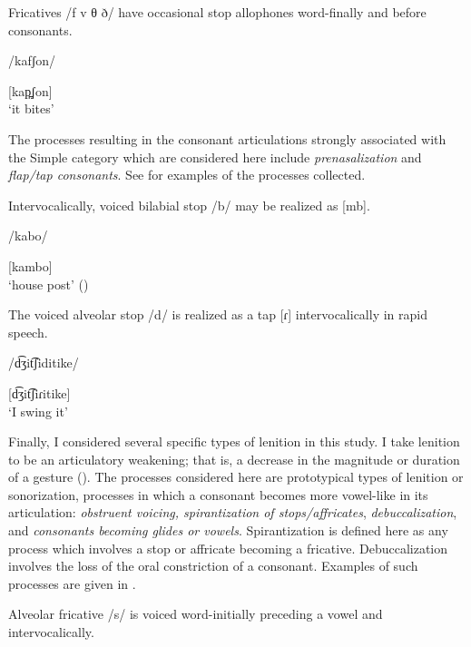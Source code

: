 \ea\label{ex:7.11}

Fricatives /f v θ ð/ have occasional stop allophones word-finally and before consonants.

/kafʃon/

[kap̪ʃon]\\
\glt ‘it bites’
\citep[16]{Newmark1957}
\z

\hspace*{-0.19368pt}The processes resulting in the consonant articulations strongly associated with the Simple category which are considered here include \textit{prenasalization} and \textit{flap/tap consonants}. See  for examples of the processes collected.

\ea\label{ex:7.12}

Intervocalically, voiced bilabial stop /b/ may be realized as [mb].

/kabo/

[kambo]\\
\glt ‘house post’
(\citealt[27]{KotapishKotapish1973})
\z

\ea\label{ex:7.13}

The voiced alveolar stop /d/ is realized as a tap [ɾ] intervocalically in rapid speech.

/d͡ʒit͡ʃiditike/

[d͡ʒit͡ʃiɾitike]\\
\glt ‘I swing it’
\citep[16]{Sandalo1997}
\z

  Finally, I considered several specific types of lenition in this study. I take lenition to be an articulatory weakening; that is, a decrease in the magnitude or duration of a gesture (\citealt{BrowmanGoldstein1992b,MowreyPagliuca1995,BybeeEasterday2019}). The processes considered here are prototypical types of lenition or sonorization, processes in which a consonant becomes more vowel-like in its articulation: \textit{obstruent voicing, spirantization of stops/affricates}, \textit{debuccalization}, and \textit{consonants becoming glides or vowels}. Spirantization is defined here as any process which involves a stop or affricate becoming a fricative. Debuccalization involves the loss of the oral constriction of a consonant. Examples of such processes are given in .

\ea\label{ex:7.14}

Alveolar fricative /s/ is voiced word-initially preceding a vowel and intervocalically.

